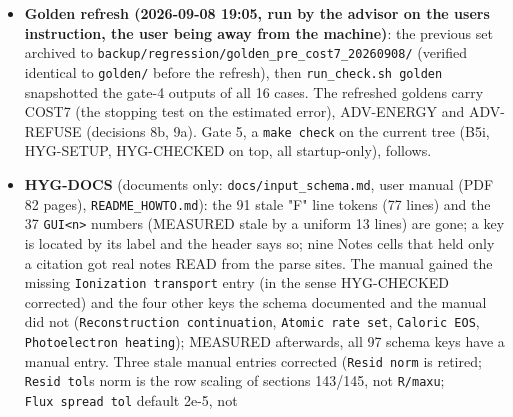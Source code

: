 \documentclass[english,a4paper]{my_memo}
\begin{document}
\begin{itemize}
  (identical max-rel values in both logs, the three \texttt{hp\_*} cases still
  identical), so B5g, B5h, the three ADV items, B5i and the hygiene items
  moved nothing on the marching path, and log10 Mdot is unchanged on all
  14 cases. The \texttt{\_adv} files move by design: \texttt{Hydro\_ioniz\_adv.txt} now has
  eight columns (\texttt{adv\_status}, the harness reports SHAPE 8 vs 7), and
  \texttt{Ion\_species\_adv.txt} moves by 0.05 (\texttt{wasp\_full\_newton}, He I at the
  outer edge) to order one (the molecular cases and the \texttt{hp\_*} cases,
  whose refused base cells now carry the equilibrium densities; the
  relative measure is element-wise, so a species the old correction had
  moved off its equilibrium value reads 1). \textbf{Goldens to be refreshed by
  the user, once, for COST7 + ADV-ENERGY + ADV-REFUSE together} (archive
  first), then \texttt{make\ check} re-run by the advisor.
\item
  \textbf{Golden refresh (2026-09-08 19:05, run by the advisor on the user\textquotesingle s
  instruction, the user being away from the machine)}: the previous set
  archived to \texttt{backup/regression/golden\_pre\_cost7\_20260908/} (verified
  identical to \texttt{golden/} before the refresh), then \texttt{run\_check.sh\ golden}
  snapshotted the gate-4 outputs of all 16 cases. The refreshed goldens
  carry COST7 (the stopping test on the estimated error), ADV-ENERGY and
  ADV-REFUSE (decisions 8b, 9a). Gate 5, a \texttt{make\ check} on the current
  tree (B5i, HYG-SETUP, HYG-CHECKED on top, all startup-only), follows.
\item
  \textbf{HYG-DOCS} (documents only: \texttt{docs/input\_schema.md}, user manual (PDF 82
  pages), \texttt{README\_HOWTO.md}): the 91 stale "F" line tokens (77 lines)
  and the 37 \texttt{GUI\textless{}n\textgreater{}} numbers (MEASURED stale by a uniform 13 lines) are
  gone; a key is located by its label and the header says so; nine Notes
  cells that held only a citation got real notes READ from the parse sites.
  The manual gained the missing \texttt{Ionization\ transport} entry (in the sense
  HYG-CHECKED corrected) and the four other keys the schema documented and
  the manual did not (\texttt{Reconstruction\ continuation}, \texttt{Atomic\ rate\ set},
  \texttt{Caloric\ EOS}, \texttt{Photoelectron\ heating}); MEASURED afterwards, all 97
  schema keys have a manual entry. Three stale manual entries corrected
  (\texttt{Resid\ norm} is retired; \texttt{Resid\ tol}\textquotesingle s norm is the row scaling of
  sections 143/145, not \texttt{\textbar{}R\textbar{}/max\textbar{}u\textbar{}}; \texttt{Flux\ spread\ tol} default 2e-5, not

\end{itemize}
\end{document}
